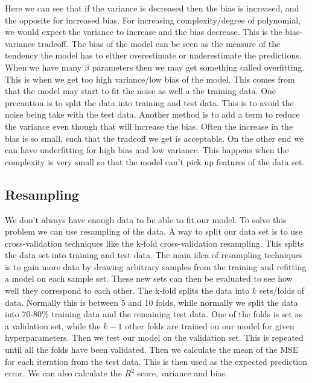 \documentclass[12pt,a4paper,english]{article}
\begin{document}
Here we can see that if the variance is decreased then the bias is increased, and the opposite for increased bias. For increasing complexity/degree of polynomial, we would expect the variance to increase and the bias decrease. This is the bias-variance tradeoff. The bias of the model can be seen as the measure of the tendency the model has to either overestimate or underestimate the predictions. When we have many $\beta$ parameters then we may get something called overfitting. This is when we get too high variance/low bias of the model. This comes from that the model may start to fit the noise as well a the training data. One precaution is to split the data into training and test data. This is to avoid the noise being take with the test data. Another method is to add a term to reduce the variance even though that will increase the bias. Often the increase in the bias is so small, such that the tradeoff we get is acceptable. On the other end we can have underfitting for high bias and low variance. This happens when the complexity is very small so that the model can't pick up features of the data set.

\subsection{Resampling}
We don't always have enough data to be able to fit our model. To solve this problem we can use resampling of the data. A way to split our data set is to use cross-validation techniques like the k-fold cross-validation resampling. This splits the data set into training and test data. The main idea of resampling techniques is to gain more data by drawing arbitrary samples from the training and refitting a model on each sample set. These new sets can then be evaluated to see how well they correspond to each other. The k-fold splits the data into $k$ sets/folds of data. Normally this is between 5 and 10 folds, while normally we split the data into 70-80\% training data and the remaining test data. One of the folds is set as a validation set, while the $k-1$ other folds are trained on our model for given hyperparameters. Then we test our model on the validation set. This is repeated until all the folds have been validated. Then we calculate the mean of the MSE for each iteration from the test data. This is then used as the expected prediction error. We can also calculate the $R^2$ score, variance and bias.
\end{document}
